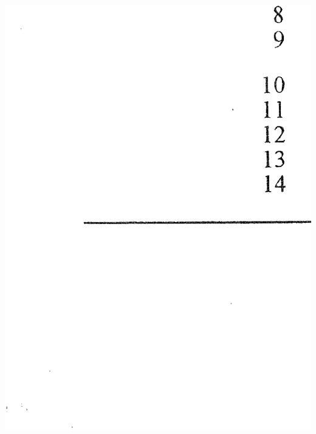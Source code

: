 \documentclass[12pt]{article}
\begin{document}
\newpage


\begin{adjustwidth}{-1cm}{0cm}
\includegraphics[width=1.1\textwidth, trim = 2cm 4cm 2cm 3cm, clip]{Md1}
\end{adjustwidth}

\newpage
\end{document}
